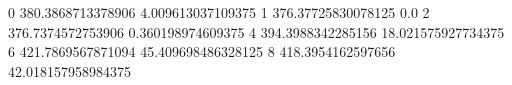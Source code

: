 0 380.3868713378906 4.009613037109375
1 376.37725830078125 0.0
2 376.7374572753906 0.360198974609375
4 394.3988342285156 18.021575927734375
6 421.7869567871094 45.409698486328125
8 418.3954162597656 42.018157958984375

